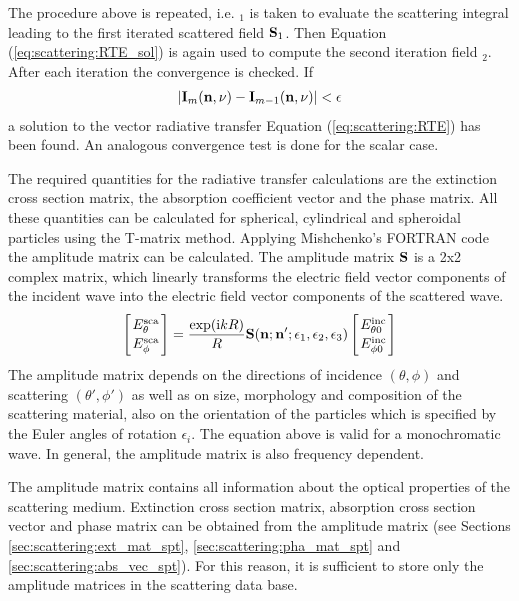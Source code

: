 The procedure above is repeated, i.e. \StoVec$_1$ is taken to evaluate
the scattering integral leading to the first iterated scattered field
${\bf S}_1$. Then Equation (\ref{eq:scattering:RTE_sol}) is again used to
compute the
second iteration field \StoVec$_2$. \\
After each iteration the convergence is checked. If 
\begin{eqnarray}
|{\bf I}_m ({\bf n}, \nu) -  {\bf I}_{m-1} ({\bf n}, \nu)| < {\bf \epsilon}
\end{eqnarray}
a solution to the vector radiative transfer Equation (\ref{eq:scattering:RTE})
has been
found. An analogous convergence test is done for the scalar case.

\label{sec:scattering:database}

The required quantities for the radiative transfer calculations are
the  extinction cross section matrix, the
absorption coefficient vector and the phase
matrix. All these quantities can be calculated for spherical,
cylindrical and spheroidal particles using the T-matrix
method. Applying Mishchenko's FORTRAN code%
the amplitude matrix can be calculated. The
amplitude matrix ${\bf S}$ is a 2x2 complex matrix, which linearly transforms 
the electric field vector components of the incident wave into the
electric field vector components of the scattered wave.  
\begin{eqnarray}
  \label{eq:ampl_matrix}
  \left[{E^{\rm sca}_{\theta}\atop E^{\rm sca}_{\phi}}\right] =
  \frac{\exp({\rm i} kR)}{R}{\bf S}({\bf n};{\bf
      n'};\epsilon_1,\epsilon_2,\epsilon_3)\left[{E^{\rm inc}_{\theta
          0}\atop E^{\rm inc}_{\phi 0}}\right] 
\end{eqnarray}
The amplitude matrix depends on the directions of incidence  $(\theta,
\phi)$  and
scattering $(\theta', \phi')$ as  well as on size, morphology and composition of the
scattering material, also on the orientation of the particles which
is specified by the Euler angles of rotation $\epsilon _i$. 
The equation above is valid for a monochromatic wave. In general, the
amplitude matrix is also frequency dependent.

The amplitude matrix contains all information about the optical
properties of the scattering medium. Extinction cross section
matrix, absorption cross section vector and phase matrix can be
obtained from the amplitude matrix (see Sections
\ref{sec:scattering:ext_mat_spt}, \ref{sec:scattering:pha_mat_spt}  and
\ref{sec:scattering:abs_vec_spt}).
For this reason, it is sufficient to store only the amplitude matrices
in the scattering data base. 

